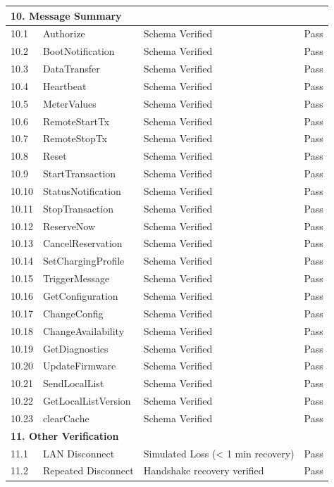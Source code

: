 \documentclass[a4paper,11pt]{report}
\begin{document}
\begin{footnotesize}
\begin{footnotesize}
\begin{longtable}{|p{1.0cm}|p{4.5cm}|p{6.5cm}|c|}
\multicolumn{4}{|l|}{\textbf{10. Message Summary}} \\
\hline
10.1 & Authorize & Schema Verified & Pass \\
\hline
10.2 & BootNotification & Schema Verified & Pass \\
\hline
10.3 & DataTransfer & Schema Verified & Pass \\
\hline
10.4 & Heartbeat & Schema Verified & Pass \\
\hline
10.5 & MeterValues & Schema Verified & Pass \\
\hline
10.6 & RemoteStartTx & Schema Verified & Pass \\
\hline
10.7 & RemoteStopTx & Schema Verified & Pass \\
\hline
10.8 & Reset & Schema Verified & Pass \\
\hline
10.9 & StartTransaction & Schema Verified & Pass \\
\hline
10.10 & StatusNotification & Schema Verified & Pass \\
\hline
10.11 & StopTransaction & Schema Verified & Pass \\
\hline
10.12 & ReserveNow & Schema Verified & Pass \\
\hline
10.13 & CancelReservation & Schema Verified & Pass \\
\hline
10.14 & SetChargingProfile & Schema Verified & Pass \\
\hline
10.15 & TriggerMessage & Schema Verified & Pass \\
\hline
10.16 & GetConfiguration & Schema Verified & Pass \\
\hline
10.17 & ChangeConfig & Schema Verified & Pass \\
\hline
10.18 & ChangeAvailability & Schema Verified & Pass \\
\hline
10.19 & GetDiagnostics & Schema Verified & Pass \\
\hline
10.20 & UpdateFirmware & Schema Verified & Pass \\
\hline
10.21 & SendLocalList & Schema Verified & Pass \\
\hline
10.22 & GetLocalListVersion & Schema Verified & Pass \\
\hline
10.23 & clearCache & Schema Verified & Pass \\
\hline
\multicolumn{4}{|l|}{\textbf{11. Other Verification}} \\
\hline
11.1 & LAN Disconnect & Simulated Loss (< 1 min recovery) & Pass \\
\hline
11.2 & Repeated Disconnect & Handshake recovery verified & Pass \\
\hline

\end{longtable}
\end{footnotesize}
\end{footnotesize}
\end{document}
